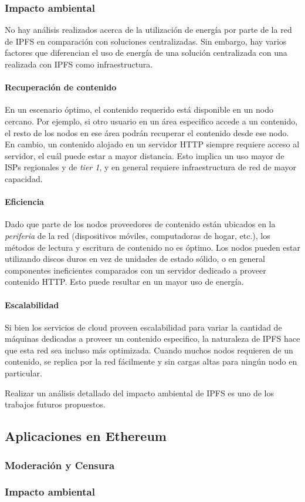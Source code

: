 \subsubsection{Impacto ambiental}

No hay análisis realizados acerca de la utilización de energía por parte de la red de IPFS en comparación con soluciones centralizadas. Sin embargo, hay varios factores que diferencian el uso de energía de una solución centralizada con una realizada con IPFS como infraestructura.

\paragraph{Recuperación de contenido} En un escenario óptimo, el contenido requerido está disponible en un nodo cercano. Por ejemplo, si otro usuario en un área especifico accede a un contenido, el resto de los nodos en ese área podrán recuperar el contenido desde ese nodo. En cambio, un contenido alojado en un servidor HTTP siempre requiere acceso al servidor, el cuál puede estar a mayor distancia. Esto implica un uso mayor de ISPs regionales y de \textit{tier 1}, y en general requiere infraestructura de red de mayor capacidad.

\paragraph{Eficiencia} Dado que parte de los nodos proveedores de contenido están ubicados en la \textit{periferia} de la red (dispositivos móviles, computadoras de hogar, etc.), los métodos de lectura y escritura de contenido no es óptimo. Los nodos pueden estar utilizando discos duros en vez de unidades de estado sólido, o en general componentes ineficientes comparados con un servidor dedicado a proveer contenido HTTP. Esto puede resultar en un mayor uso de energía.

\paragraph{Escalabilidad} Si bien los servicios de cloud proveen escalabilidad para variar la cantidad de máquinas dedicadas a proveer un contenido especifico, la naturaleza de IPFS hace que esta red sea incluso más optimizada. Cuando muchos nodos requieren de un contenido, se replica por la red fácilmente y sin cargas altas para ningún nodo en particular.

Realizar un análisis detallado del impacto ambiental de IPFS es uno de los trabajos futuros propuestos.

\subsection{Aplicaciones en Ethereum}

\subsubsection{Moderación y Censura}

\subsubsection{Impacto ambiental}

